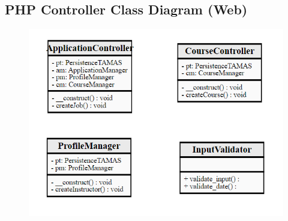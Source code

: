 \documentclass[12pt]{article}
\begin{document}
\subsection{PHP Controller Class Diagram (Web)}
\begin{figure}[H]
	\centering
	\includegraphics[scale=1.05]{./ClassDiagrams/ControllerPackageClassDiagramPHP.png}
\end{figure}
\end{document}
